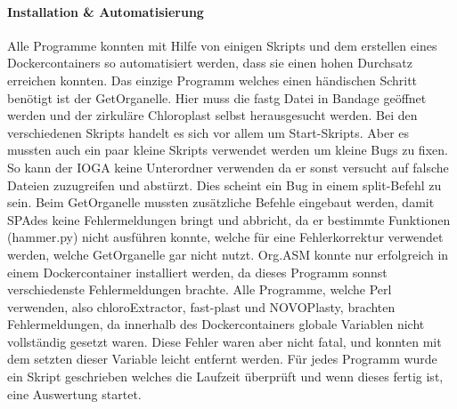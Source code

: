\documentclass{scrartcl}
\begin{document}
\paragraph{Installation \& Automatisierung}
\label{sec-3-2-2-1}
Alle Programme konnten mit Hilfe von einigen Skripts und dem erstellen eines Dockercontainers so 
automatisiert werden, dass sie einen hohen Durchsatz erreichen konnten. Das einzige Programm welches
einen händischen Schritt benötigt ist der GetOrganelle. Hier muss die fastg Datei in Bandage
geöffnet werden und der zirkuläre Chloroplast selbst herausgesucht werden.
Bei den verschiedenen Skripts handelt es sich vor allem um Start-Skripts. Aber es mussten auch ein paar 
kleine Skripts verwendet werden um kleine Bugs zu fixen. So kann der IOGA keine Unterordner verwenden da er sonst
versucht auf falsche Dateien zuzugreifen und abstürzt. Dies scheint ein Bug in einem split-Befehl zu sein. Beim GetOrganelle mussten
zusätzliche Befehle eingebaut werden, damit SPAdes keine Fehlermeldungen bringt und abbricht, da er bestimmte Funktionen (hammer.py) nicht ausführen konnte,
welche für eine Fehlerkorrektur verwendet werden, welche GetOrganelle gar nicht nutzt. Org.ASM konnte nur erfolgreich in einem Dockercontainer
installiert werden, da dieses Programm sonnst verschiedenste Fehlermeldungen brachte. Alle Programme, welche Perl verwenden, also
chloroExtractor, fast-plast und NOVOPlasty, brachten Fehlermeldungen, da innerhalb des Dockercontainers globale Variablen nicht vollständig gesetzt waren. 
Diese Fehler waren aber nicht fatal, und konnten mit dem setzten dieser Variable leicht entfernt werden. 
Für jedes Programm wurde ein Skript geschrieben welches die Laufzeit überprüft und wenn dieses fertig ist, eine Auswertung startet.
\end{document}
